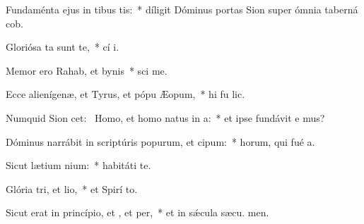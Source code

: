 \item Fundaménta ejus in tibus tis:~* díligit Dóminus portas Sion super ómnia taberná cob.
\item Gloriósa ta sunt  te,~* cí i.
\item Memor ero Rahab, et bynis~* sci me.
\item Ecce alienígenæ, et Tyrus, et pópu Æopum,~* hi fu lic.
\item Numquid Sion cet:~\pscross{} Homo, et homo natus  in a:~* et ipse fundávit e mus?
\item Dóminus narrábit in scriptúris popurum, et cipum:~* horum, qui fué  a.
\item Sicut lætium nium:~* habitáti   te.
\item Glória tri, et lio,~* et Spirí to.
\item Sicut erat in princípio, et , et per,~* et in sǽcula sæcu. men.
